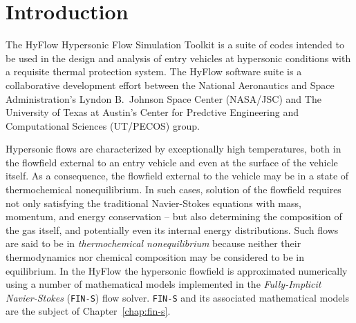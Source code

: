 \chapter{Introduction}

The HyFlow Hypersonic Flow Simulation Toolkit is a suite of codes intended to be used in the design and analysis of entry vehicles at hypersonic conditions with a requisite thermal protection system.  The HyFlow software suite is a collaborative development effort between the National Aeronautics and Space Administration's Lyndon B.\ Johnson Space Center (NASA/JSC) and The University of Texas at Austin's Center for Predctive Engineering and Computational Sciences (UT/PECOS) group.

Hypersonic flows are characterized by exceptionally high temperatures, both in the flowfield external to an entry vehicle and even at the surface of the vehicle itself.  As a consequence, the flowfield external to the vehicle may be in a state of thermochemical nonequilibrium.  In such cases, solution of the flowfield requires not only satisfying the traditional Navier-Stokes equations with mass, momentum, and energy conservation -- but also determining the composition of the gas itself, and potentially even its internal energy distributions.  Such flows are said to be in \emph{thermochemical nonequilibrium} because neither their thermodynamics nor chemical composition may be considered to be in equilibrium.  In the HyFlow the hypersonic flowfield is approximated numerically using a number of mathematical models implemented in the \emph{Fully-Implicit Navier-Stokes} (\texttt{FIN-S}) flow solver.  \texttt{FIN-S} and its associated mathematical models are the subject of Chapter~\ref{chap:fin-s}.